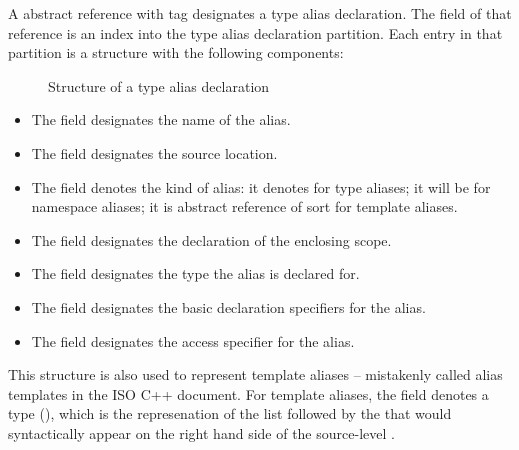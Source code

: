 A  abstract reference with tag  designates a type alias declaration.
The  field of that reference is an index into the type alias declaration partition.
Each entry in that partition is a structure with the following components:
%
\begin{figure}[H]
	\centering
	\caption{Structure of a type alias declaration}
	\label{fig:ifc-type-alias-decl-structure}
\end{figure}
%
\begin{itemize}
	\item The  field designates the name of the alias.
	\item The  field designates the source location.
	\item The  field denotes the kind of alias: it denotes  for type aliases; it will be  for namespace aliases; it is abstract reference of sort  for template aliases.
	\item The  field designates the declaration of the enclosing scope.
	\item The  field designates the type the alias is declared for.
	\item The  field designates the basic declaration specifiers for the alias.
	\item The  field designates the access specifier for the alias.
\end{itemize}

This structure is also used to represent template aliases -- mistakenly called alias templates in the ISO C++ document.  For template aliases,
the  field denotes a  type (), which is the represenation of the  list followed by the  
that would syntactically appear on the right hand side of the source-level .


